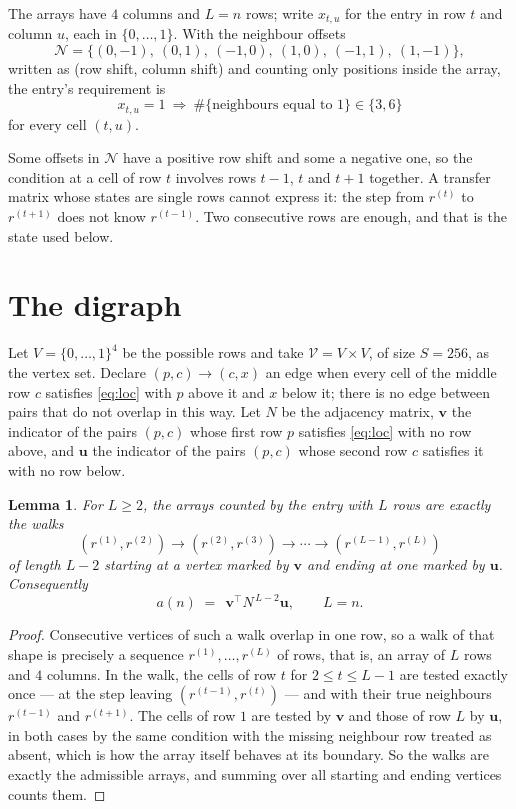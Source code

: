 \documentclass[11pt,a4paper]{article}
\theoremstyle{plain}
\newtheorem{lemma}[theorem]{Lemma}
\theoremstyle{definition}
\begin{document}
The arrays have $4$ columns and $L=n$ rows; write $x_{t,u}$ for the entry in
row $t$ and column $u$, each in $\{0,\dots,1\}$. With the neighbour offsets
\[
\mathcal N=\{(0,-1),\ (0,1),\ (-1,0),\ (1,0),\ (-1,1),\ (1,-1)\},
\]
written as (row shift, column shift) and counting only positions inside the array, the
entry's requirement is
\begin{equation}\label{eq:loc}
x_{t,u}=1\ \Rightarrow\ \#\{\text{neighbours equal to }1\}\in\{3,6\}
\end{equation}
for every cell $(t,u)$.

Some offsets in $\mathcal N$ have a positive row shift and some a negative one, so the
condition at a cell of row $t$ involves rows $t-1$, $t$ and $t+1$ together. A transfer
matrix whose states are single rows cannot express it: the step from $r^{(t)}$ to
$r^{(t+1)}$ does not know $r^{(t-1)}$. Two consecutive rows are enough, and that is
the state used below.

\section{The digraph}

Let $V=\{0,\dots,1\}^{4}$ be the possible rows and take
$\mathcal V=V\times V$, of size $S=256$, as the vertex set. Declare $(p,c)\to(c,x)$ an edge
when every cell of the middle row $c$ satisfies \eqref{eq:loc} with $p$ above it and $x$
below it; there is no edge between pairs that do not overlap in this way. Let $N$ be the
adjacency matrix, $\mathbf{v}$ the indicator of the pairs $(p,c)$ whose first row $p$
satisfies \eqref{eq:loc} with no row above, and $\mathbf{u}$ the indicator of
the pairs $(p,c)$ whose second row $c$ satisfies it with no row below.

\begin{lemma}\label{lem:walk}
For $L\ge2$, the arrays counted by the entry with $L$ rows are exactly the walks
\[
(r^{(1)},r^{(2)})\to(r^{(2)},r^{(3)})\to\cdots\to(r^{(L-1)},r^{(L)})
\]
of length $L-2$ starting at a vertex marked by $\mathbf{v}$ and ending at one marked by
$\mathbf{u}$. Consequently
\[
a(n)\;=\;\,\mathbf{v}^{\!\top}N^{\,L-2}\mathbf{u},\qquad L=n .
\]
\end{lemma}

\begin{proof}
Consecutive vertices of such a walk overlap in one row, so a walk of that shape is
precisely a sequence $r^{(1)},\dots,r^{(L)}$ of rows, that is, an array of $L$ rows
and $4$ columns. In the walk, the cells of row $t$ for $2\le t\le L-1$ are tested
exactly once --- at the step leaving $(r^{(t-1)},r^{(t)})$ --- and with their true
neighbours $r^{(t-1)}$ and $r^{(t+1)}$. The cells of row $1$ are tested by
$\mathbf{v}$ and those of row $L$ by $\mathbf{u}$, in both cases by the same condition
with the missing neighbour row treated as absent, which is how the array itself behaves at
its boundary. So the walks are exactly the admissible arrays, and summing over all starting
and ending vertices counts them.
\end{proof}
\end{document}
